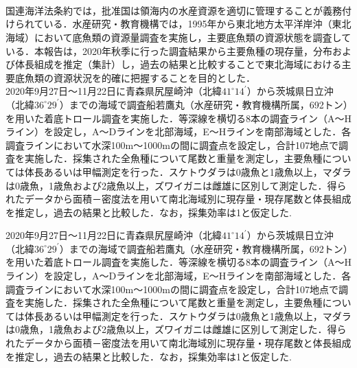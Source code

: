 \documentclass[12pt]{article}
\begin{document}
\setcounter{page}{1}
\renewcommand\citeleft{(} 
\renewcommand\citeright{)}

\\
\\
\ \\

国連海洋法条約では，批准国は領海内の水産資源を適切に管理することが義務付けられている．水産研究・教育機構では，1995年から東北地方太平洋岸沖（東北海域）において底魚類の資源量調査を実施し，主要底魚類の資源状態を調査している．本報告は，2020年秋季に行った調査結果から主要魚種の現存量，分布および体長組成を推定（集計）し，過去の結果と比較することで東北海域における主要底魚類の資源状況を的確に把握することを目的とした．
\ \\

2020年9月27日～11月22日に青森県尻屋崎沖（北緯$\textrm{41}^\circ \textrm{14}^\prime$）から茨城県日立沖（北緯$\textrm{36}^\circ \textrm{29}^\prime$）までの海域で調査船若鷹丸（水産研究・教育機構所属，692トン）を用いた着底トロール調査を実施した．等深線を横切る8本の調査ライン（A～Hライン）を設定し，A～Dラインを北部海域，E～Hラインを南部海域とした．各調査ラインにおいて水深100m～1000mの間に調査点を設定し，合計107地点で調査を実施した．採集された全魚種について尾数と重量を測定し，主要魚種については体長あるいは甲幅測定を行った．スケトウダラは0歳魚と1歳魚以上，マダラは0歳魚，1歳魚および2歳魚以上，ズワイガニは雌雄に区別して測定した．得られたデータから面積－密度法を用いて南北海域別に現存量・現存尾数と体長組成を推定し，過去の結果と比較した．なお，採集効率は1と仮定した.

2020年9月27日～11月22日に青森県尻屋崎沖（北緯$\textrm{41}^\circ \textrm{14}^\prime$）から茨城県日立沖（北緯$\textrm{36}^\circ \textrm{29}^\prime$）までの海域で調査船若鷹丸（水産研究・教育機構所属，692トン）を用いた着底トロール調査を実施した．等深線を横切る8本の調査ライン（A～Hライン）を設定し，A～Dラインを北部海域，E～Hラインを南部海域とした．各調査ラインにおいて水深100m～1000mの間に調査点を設定し，合計107地点で調査を実施した．採集された全魚種について尾数と重量を測定し，主要魚種については体長あるいは甲幅測定を行った．スケトウダラは0歳魚と1歳魚以上，マダラは0歳魚，1歳魚および2歳魚以上，ズワイガニは雌雄に区別して測定した．得られたデータから面積－密度法を用いて南北海域別に現存量・現存尾数と体長組成を推定し，過去の結果と比較した．なお，採集効率は1と仮定した.
\end{document}
